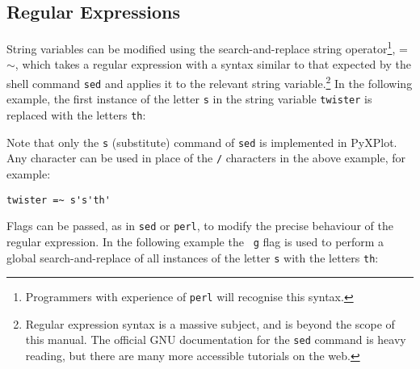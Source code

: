\vspace{3mm}
\newline
{}\newline
{}\newline
{}
\vspace{3mm}

\subsection{Regular Expressions}

String variables can be modified using the search-and-replace string
operator\footnote{Programmers with
experience of {\tt perl} will recognise this syntax.}, =$\sim$, which takes a regular expression with a syntax similar to that
expected by the shell command {\tt sed} and applies it to the relevant string variable.\footnote{Regular
expression syntax is a massive subject, and is beyond the scope of this manual.
The official GNU documentation for the {\tt sed} command is heavy reading, but
there are many more accessible tutorials on the web.} In the following example, the first instance of the letter {\tt s} in
the string variable {\tt twister} is replaced with the letters {\tt th}:

\vspace{3mm}
\newline
{}\newline
{}\newline
{}
\vspace{3mm}

Note that only the {\tt s} (substitute) command of {\tt sed} is implemented in
PyXPlot. Any character can be used in place of the {\tt /} characters in the
above example, for example:

\begin{verbatim}
twister =~ s's'th'
\end{verbatim}

\noindent Flags can be passed, as in {\tt sed} or {\tt perl}, to modify the
precise behaviour of the regular expression. In the following example the {\tt
g} flag is used to perform a global search-and-replace of all instances of the
letter {\tt s} with the letters {\tt th}:

